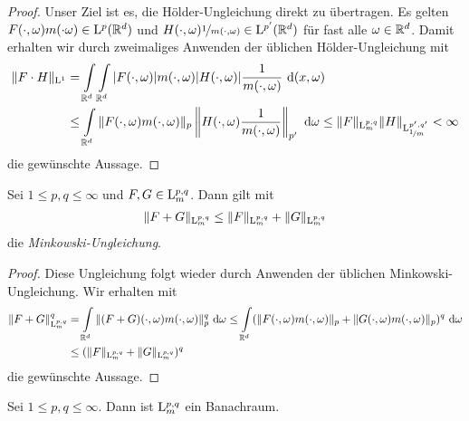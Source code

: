 \begin{proof}
	Unser Ziel ist es, die Hölder-Ungleichung direkt zu übertragen. Es gelten\\
	$ F(\cdot, \omega) m(\cdot \omega) \in \mathrm{L}^p(\mathbb{R}^d) $ und $ H(\cdot , \omega) \nicefrac{1}{m(\cdot, \omega)} \in \mathrm{L}^{p^\prime}(\mathbb{R}^d) $ für fast alle $ \omega \in \mathbb{R}^d $.
	Damit erhalten wir durch zweimaliges Anwenden der üblichen Hölder-Ungleichung mit
	\begin{align*}
	\| F \cdot H \|_{\mathrm{L}^1}
	&=
	\int 
	\limits_{\mathbb{R}^d} 
	\int 
	\limits_{\mathbb{R}^d} |F(\cdot, \omega)| m(\cdot,\omega) |H(\cdot,\omega)| \frac{1}{m(\cdot, \omega)} \text{ d} (x,\omega) \\
	&\leq 
	\int \limits_{\mathbb{R}^d}
	\| F(\cdot , \omega) m(\cdot, \omega) \|_{p}
	\left\| H(\cdot,\omega) \frac{1}{m(\cdot , \omega)} \right\|_{p^\prime} \text{ d} \omega
	\leq 
	 \| F \|_{\mathrm{L}^{p,q}_m} \| H \|_{\mathrm{L}^{p^\prime,q^\prime}_{\nicefrac{1}{m}}}
	< \infty
	\end{align*}
	die gewünschte Aussage.
\end{proof}

\newpage

\begin{sz}\label{minkowski_mixed_norm}
	Sei $ 1 \leq p,q \leq \infty  $ und $ F,G \in \mathrm{L}^{p,q}_m $.
	Dann gilt mit
	\begin{align*}
	\| F + G \|_{\mathrm{L}^{p,q}_m} \leq \| F \|_{\mathrm{L}^{p,q}_m} + \| G \|_{\mathrm{L}^{p,q}_m} 
	\end{align*}
	die \textit{Minkowski-Ungleichung}.
\end{sz}

\begin{proof}
	Diese Ungleichung folgt wieder durch Anwenden der üblichen Minkowski-Ungleichung. Wir erhalten mit
	\begin{align*}
	\| F + G \|_{\mathrm{L}^{p,q}_m}^q
	&=
	\int 
	\limits_{\mathbb{R}^d}
	\| (F+G)(\cdot, \omega) m(\cdot, \omega) \|_p^q \text{ d} \omega 
	\leq 
	\int 
	\limits_{\mathbb{R}^d}
	(\| F(\cdot, \omega) m(\cdot, \omega) \|_{p} + \| G(\cdot, \omega) m(\cdot, \omega) \|_{p})^q \text{ d} \omega\\
	&\leq
	(\| F \|_{\mathrm{L}^{p,q}_m} + \| G\|_{\mathrm{L}^{p,q}_m})^q
	\end{align*}
	die gewünschte Aussage.
\end{proof}


\begin{sz}
	Sei $ 1 \leq p,q \leq \infty  $. Dann ist $ \mathrm{L}^{p,q}_m $ ein Banachraum.
\end{sz}

